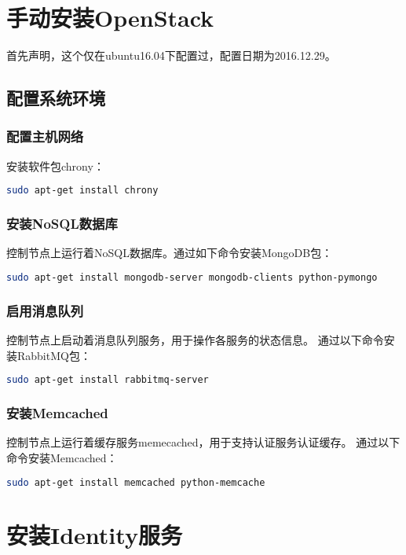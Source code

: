 \documentclass[a4paper,left=2.5cm,right=2.5cm,11pt]{article}
\begin{document}

\clearpage

\section{手动安装OpenStack}
	首先声明，这个仅在ubuntu16.04下配置过，配置日期为2016.12.29。\par

\subsection{配置系统环境}
\subsubsection{配置主机网络}
	安装软件包chrony：
	\begin{lstlisting}[language = bash]
	sudo apt-get install chrony
	\end{lstlisting}

\subsubsection{安装NoSQL数据库}
	控制节点上运行着NoSQL数据库。通过如下命令安装MongoDB包：
	\begin{lstlisting}[language = bash]
	sudo apt-get install mongodb-server mongodb-clients python-pymongo
	\end{lstlisting}

\subsubsection{启用消息队列}
	控制节点上启动着消息队列服务，用于操作各服务的状态信息。
	通过以下命令安装RabbitMQ包：
	\begin{lstlisting}[language = bash]
	sudo apt-get install rabbitmq-server
	\end{lstlisting}

\subsubsection{安装Memcached}
	控制节点上运行着缓存服务memecached，用于支持认证服务认证缓存。
	通过以下命令安装Memcached：
	\begin{lstlisting}[language = bash]
	sudo apt-get install memcached python-memcache
	\end{lstlisting}

\section{安装Identity服务}
\end{document}
